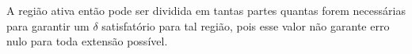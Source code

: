 A região ativa então pode ser dividida em 
tantas partes quantas forem necessárias 
para garantir um $\delta$ satisfatório para tal região,
pois esse valor não garante erro nulo para toda extensão
possível.


